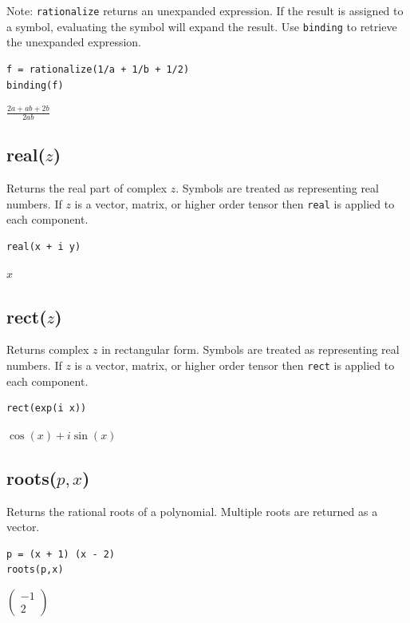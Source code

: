 \documentclass[12pt]{article}
\begin{document}
\bigskip
Note:
\verb$rationalize$
returns an unexpanded expression.
If the result is assigned to a symbol, evaluating the symbol will expand the result.
Use
\verb$binding$
to retrieve the unexpanded expression.

{\color{blue}
\begin{verbatim}
f = rationalize(1/a + 1/b + 1/2)
binding(f)
\end{verbatim}
}

$\displaystyle \frac{2a+ab+2b}{2ab}$

\subsection*{real($z$)}

Returns the real part of complex $z$.
Symbols are treated as representing real numbers.
If $z$ is a vector, matrix, or higher order tensor then
\verb$real$ is applied to each component.

{\color{blue}
\begin{verbatim}
real(x + i y)
\end{verbatim}
}

$x$

\subsection*{rect($z$)}

Returns complex $z$ in rectangular form.
Symbols are treated as representing real numbers.
If $z$ is a vector, matrix, or higher order tensor then
\verb$rect$ is applied to each component.

{\color{blue}
\begin{verbatim}
rect(exp(i x))
\end{verbatim}
}

$\cos(x)+i\sin(x)$

\subsection*{roots($p,x$)}

Returns the rational roots of a polynomial.
Multiple roots are returned as a vector.

{\color{blue}
\begin{verbatim}
p = (x + 1) (x - 2)
roots(p,x)
\end{verbatim}
}

$\displaystyle
\begin{pmatrix}
-1
\\[1ex]
2
\end{pmatrix}
$
\end{document}
